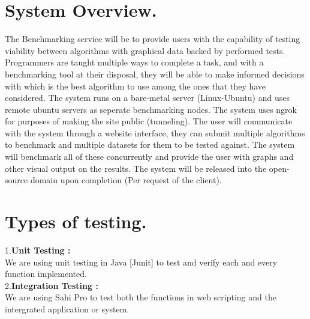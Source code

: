 \documentclass[runningheads,a4paper]{article}
\begin{document}
\section{System Overview.}
\raggedright{
The Benchmarking service will be to provide users with the capability of testing viability between algorithms
with graphical data backed by performed tests. Programmers are taught multiple ways to complete a task,
and with a benchmarking tool at their disposal, they will be able to make informed decisions with which is the
best algorithm to use among the ones that they have considered.
The system runs on a bare-metal server (Linux-Ubuntu) and uses remote ubuntu servers as seperate benchmarking nodes. The system uses ngrok for purposes of making the site public (tunneling). 
The user will communicate with the system through a website interface, they can submit multiple algorithms
to benchmark and multiple datasets for them to be tested against. The system will benchmark all of these
concurrently and provide the user with graphs and other visual output on the results.
The system will be released into the open-source domain upon completion (Per request of the client).
\\
}
\section{Types of testing.}
\raggedright{
1.\textbf{Unit Testing :}  \\
We are using unit testing in Java [Junit] to test and verify each and every function implemented.\\
2.\textbf{Integration Testing :}  \\
We are using Sahi Pro to test both the functions in web scripting and the intergrated application or system.

}
\end{document}
